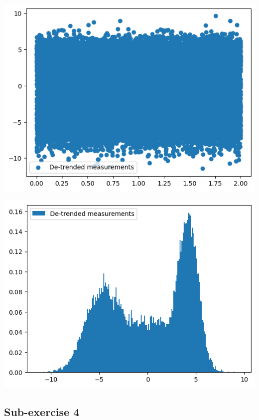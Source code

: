\documentclass[10pt,a4paper]{article}
\begin{document}
\begin{minipage}[c]{0.5\textwidth}
    \centering
    \includegraphics[width=\textwidth]{point2.png}
\end{minipage}%
\begin{minipage}[c]{0.5\textwidth}
  \centering
  \includegraphics[width=\textwidth]{point3.png}
\end{minipage}

\subsection*{Sub-exercise 4}
\end{document}
